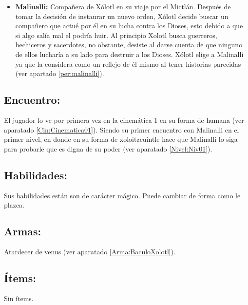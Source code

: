 \begin{itemize}
\begin{itemize}
		\item \textbf{Malinalli:} Compañera de Xólotl en su viaje por el Mictlán. Después de tomar la decisión de instaurar un nuevo orden, Xólotl decide buscar un compañero que actué por él en su lucha contra los Dioses, esto debido a que si algo salía mal el podría huir. Al principio Xolotl busca guerreros, hechiceros y sacerdotes, no obstante, desiste al darse cuenta de que ninguno de ellos lucharía a su lado para destruir a los Dioses. Xólotl elige a Malinalli ya que la considera como un reflejo de él mismo al tener historias parecidas (ver apartado \ref{per:malinalli}).
	\end{itemize}			  
\end{itemize}


\subsection{Encuentro:}
El jugador lo ve por primera vez en la cinemática 1 en su forma de humana (ver aparatado \ref{Cin:Cinematica01}). Siendo su primer encuentro con Malinalli en el primer nivel, en donde en su forma de xoloitzcuintle hace que Malinalli lo siga para probarle que es digna de su poder (ver aparatado \ref{Nivel:Niv01}). 

\subsection{Habilidades:}
Sus habilidades están son de carácter mágico. Puede cambiar de forma como le plazca.
\subsection{Armas:}
Atardecer de venus (ver aparatado \ref{Arma:BaculoXolotl}).
\subsection{Ítems:}
Sin ítems.


